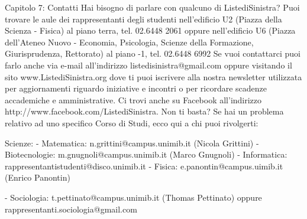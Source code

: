 Capitolo 7: Contatti
Hai bisogno di parlare con qualcuno di ListediSinistra? Puoi trovare le aule dei rappresentanti degli studenti  nell'edificio U2 (Piazza della Scienza - Fisica) al piano terra, tel. 02.6448 2061 oppure nell'edificio U6 (Piazza dell'Ateneo Nuovo - Economia, Psicologia, Scienze della Formazione, Giurisprudenza, Rettorato) al piano -1, tel. 02.6448 6992
Se vuoi contattarci puoi farlo anche via e-mail all’indirizzo listedisinistra@gmail.com oppure visitando il sito www.ListediSinistra.org dove ti puoi iscrivere alla nostra newsletter utilizzata per aggiornamenti riguardo iniziative e incontri o per ricordare scadenze accademiche e amministrative. Ci trovi anche su Facebook all'indirizzo http://www.facebook.com/ListediSinistra.
Non ti basta? Se hai un problema relativo ad uno specifico Corso di Studi, ecco qui a chi puoi rivolgerti:

Scienze:
   - Matematica: n.grittini@campus.unimib.it (Nicola Grittini)
   - Biotecnologie: m.gnugnoli@campus.unimib.it (Marco Gnugnoli)
   - Informatica: rappresentantistudenti@disco.unimib.it
   - Fisica: e.panontin@campus.uimib.it (Enrico Panontin)
   
   - Sociologia: t.pettinato@campus.unimib.it (Thomas Pettinato) oppure rappresentanti.sociologia@gmail.com
   
   
